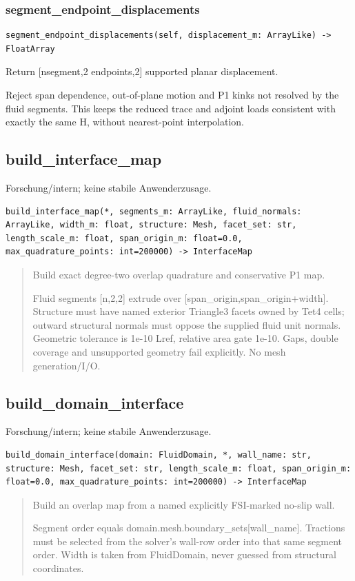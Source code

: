 \subsubsection*{segment\_endpoint\_displacements}
\begin{lstlisting}
segment_endpoint_displacements(self, displacement_m: ArrayLike) -> FloatArray
\end{lstlisting}
Return [nsegment,2 endpoints,2] supported planar displacement.\par Reject span dependence, out-of-plane motion and P1 kinks not resolved by the fluid segments. This keeps the reduced trace and adjoint loads consistent with exactly the same H, without nearest-point interpolation.
\subsection{build\_interface\_map}
Forschung/intern; keine stabile Anwenderzusage.
\begin{lstlisting}
build_interface_map(*, segments_m: ArrayLike, fluid_normals: ArrayLike, width_m: float, structure: Mesh, facet_set: str, length_scale_m: float, span_origin_m: float=0.0, max_quadrature_points: int=200000) -> InterfaceMap
\end{lstlisting}
\begin{quote}
Build exact degree-two overlap quadrature and conservative P1 map.\par Fluid segments [n,2,2] extrude over [span\_origin,span\_origin+width]. Structure must have named exterior Triangle3 facets owned by Tet4 cells; outward structural normals must oppose the supplied fluid unit normals. Geometric tolerance is 1e-10 Lref, relative area gate 1e-10. Gaps, double coverage and unsupported geometry fail explicitly. No mesh generation/I/O.
\end{quote}
\subsection{build\_domain\_interface}
Forschung/intern; keine stabile Anwenderzusage.
\begin{lstlisting}
build_domain_interface(domain: FluidDomain, *, wall_name: str, structure: Mesh, facet_set: str, length_scale_m: float, span_origin_m: float=0.0, max_quadrature_points: int=200000) -> InterfaceMap
\end{lstlisting}
\begin{quote}
Build an overlap map from a named explicitly FSI-marked no-slip wall.\par Segment order equals domain.mesh.boundary\_sets[wall\_name]. Tractions must be selected from the solver's wall-row order into that same segment order. Width is taken from FluidDomain, never guessed from structural coordinates.
\end{quote}
